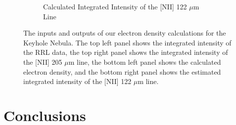 \begin{figure}
\begin{subfigure}[t]{0.49\textwidth}
        \caption{Calculated Integrated Intensity of the [NII] 122 $\mu$m Line}
    \end{subfigure}
    \caption[Calculated Electron Density and {[}NII{]} 122 $\mu$m Maps for the Keyhole Nebula]{
        The inputs and outputs of our electron density calculations for the Keyhole Nebula.
        The top left panel shows the integrated intensity of the RRL data, the top right panel shows the integrated intensity of the [NII] 205 $\mu$m line, the bottom left panel shows the calculated electron density, and the bottom right panel shows the estimated integrated intensity of the [NII] 122 $\mu$m line.
        }
    \label{carina/fig:results}
\end{figure}

\section{Conclusions}
